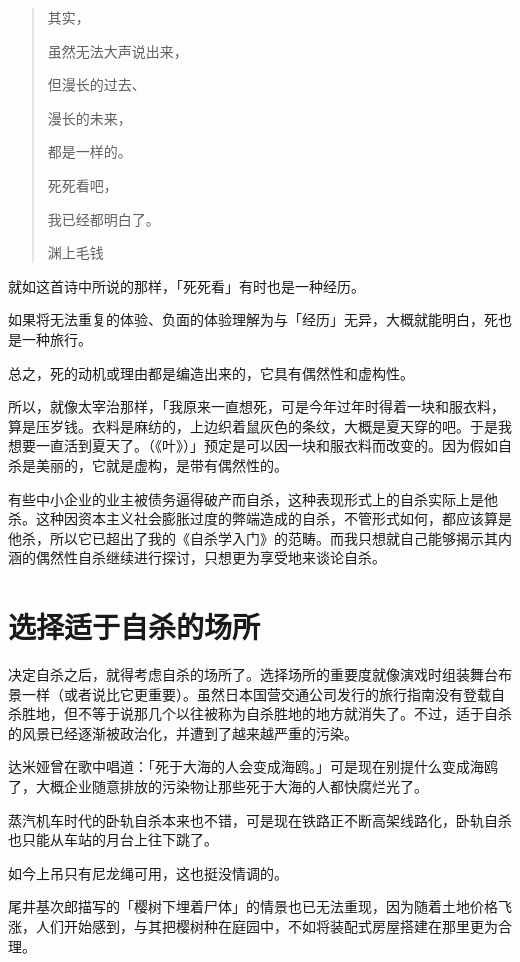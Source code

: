 \documentclass[UTF8]{ctexart}
\begin{document}
\newpage

\begin{verse}
其实，

虽然无法大声说出来，

但漫长的过去、

漫长的未来，

都是一样的。

死死看吧，

我已经都明白了。

渊上毛钱
\end{verse}

就如这首诗中所说的那样，「死死看」有时也是一种经历。

如果将无法重复的体验、负面的体验理解为与「经历」无异，大概就能明白，死也是一种旅行。

总之，死的动机或理由都是编造出来的，它具有偶然性和虚构性。

所以，就像太宰治那样，「我原来一直想死，可是今年过年时得着一块和服衣料，算是压岁钱。衣料是麻纺的，上边织着鼠灰色的条纹，大概是夏天穿的吧。于是我想要一直活到夏天了。（《叶》）」预定是可以因一块和服衣料而改变的。因为假如自杀是美丽的，它就是虚构，是带有偶然性的。

有些中小企业的业主被债务逼得破产而自杀，这种表现形式上的自杀实际上是他杀。这种因资本主义社会膨胀过度的弊端造成的自杀，不管形式如何，都应该算是他杀，所以它已超出了我的《自杀学入门》的范畴。而我只想就自己能够揭示其内涵的偶然性自杀继续进行探讨，只想更为享受地来谈论自杀。

\section{选择适于自杀的场所}

决定自杀之后，就得考虑自杀的场所了。选择场所的重要度就像演戏时组装舞台布景一样（或者说比它更重要）。虽然日本国营交通公司发行的旅行指南没有登载自杀胜地，但不等于说那几个以往被称为自杀胜地的地方就消失了。不过，适于自杀的风景已经逐渐被政治化，并遭到了越来越严重的污染。

达米娅曾在歌中唱道：「死于大海的人会变成海鸥。」可是现在别提什么变成海鸥了，大概企业随意排放的污染物让那些死于大海的人都快腐烂光了。

蒸汽机车时代的卧轨自杀本来也不错，可是现在铁路正不断高架线路化，卧轨自杀也只能从车站的月台上往下跳了。

如今上吊只有尼龙绳可用，这也挺没情调的。

尾井基次郎描写的「樱树下埋着尸体」的情景也已无法重现，因为随着土地价格飞涨，人们开始感到，与其把樱树种在庭园中，不如将装配式房屋搭建在那里更为合理。
\end{document}
